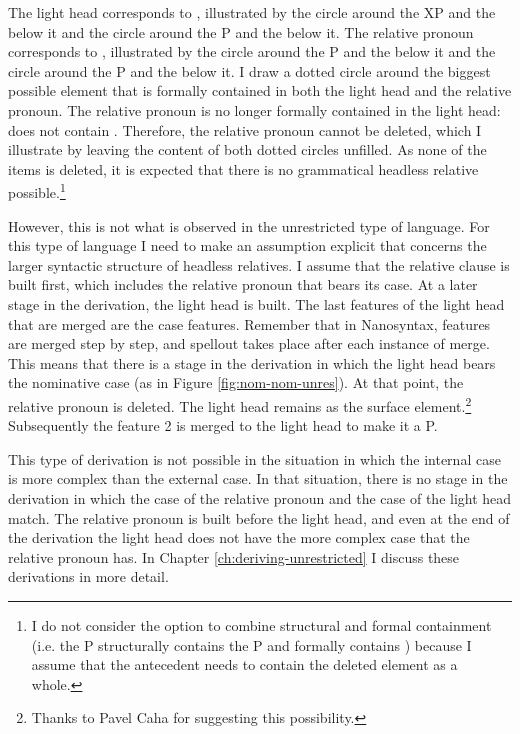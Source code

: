 The light head corresponds to , illustrated by the circle around the XP and the  below it and the circle around the P and the  below it. The relative pronoun corresponds to , illustrated by the circle around the P and the  below it and the circle around the P and the  below it.
I draw a dotted circle around the biggest possible element that is formally contained in both the light head and the relative pronoun.
The relative pronoun is no longer formally contained in the light head:  does not contain . Therefore, the relative pronoun cannot be deleted, which I illustrate by leaving the content of both dotted circles unfilled.
As none of the items is deleted, it is expected that there is no grammatical headless relative possible.\footnote{
I do not consider the option to combine structural and formal containment (i.e. the P structurally contains the P and  formally contains ) because I assume that the antecedent needs to contain the deleted element as a whole.
}

However, this is not what is observed in the unrestricted type of language.
For this type of language I need to make an assumption explicit that concerns the larger syntactic structure of headless relatives. I assume that the relative clause is built first, which includes the relative pronoun that bears its case.
At a later stage in the derivation, the light head is built. The last features of the light head that are merged are the case features. Remember that in Nanosyntax, features are merged step by step, and spellout takes place after each instance of merge. This means that there is a stage in the derivation in which the light head bears the nominative case (as in Figure \ref{fig:nom-nom-unres}). At that point, the relative pronoun is deleted. The light head remains as the surface element.\footnote{
Thanks to Pavel Caha for suggesting this possibility.
}
Subsequently the feature 2 is merged to the light head to make it a P.

This type of derivation is not possible in the situation in which the internal case is more complex than the external case. In that situation, there is no stage in the derivation in which the case of the relative pronoun and the case of the light head match. The relative pronoun is built before the light head, and even at the end of the derivation the light head does not have the more complex case that the relative pronoun has.
In Chapter \ref{ch:deriving-unrestricted} I discuss these derivations in more detail.

